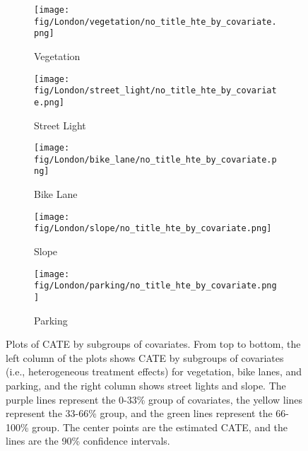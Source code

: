 \documentclass[preprint,12pt, authoryear]{elsarticle}
\begin{document}
\begin{figure}
    \centering

    \begin{subfigure}{.42\textwidth}
        \centering
        \texttt{[image: fig/London/vegetation/no\_title\_hte\_by\_covariate.png]}
        \caption*{Vegetation}
    \end{subfigure}%
    \hfill
    \begin{subfigure}{.42\textwidth}
        \centering
        \texttt{[image: fig/London/street\_light/no\_title\_hte\_by\_covariate.png]}
        \caption*{Street Light}
    \end{subfigure}

    \begin{subfigure}{.42\textwidth}
        \centering
        \texttt{[image: fig/London/bike\_lane/no\_title\_hte\_by\_covariate.png]}
        \caption*{Bike Lane}
    \end{subfigure}%
    \hfill
    \begin{subfigure}{.42\textwidth}
        \centering
        \texttt{[image: fig/London/slope/no\_title\_hte\_by\_covariate.png]}
        \caption*{Slope}
    \end{subfigure}

    \begin{subfigure}{.42\textwidth}
        \centering
        \texttt{[image: fig/London/parking/no\_title\_hte\_by\_covariate.png]}
        \caption*{Parking}
    \end{subfigure}
    \hfill
    \begin{subfigure}{.4\textwidth}
    \end{subfigure}

    \caption{Plots of CATE by subgroups of covariates. From top to bottom, the left column of the plots shows CATE by subgroups of covariates (i.e., heterogeneous treatment effects) for vegetation, bike lanes, and parking, and the right column shows street lights and slope. The purple lines represent the 0-33\% group of covariates, the yellow lines represent the 33-66\% group, and the green lines represent the 66-100\% group. The center points are the estimated CATE, and the lines are the 90\% confidence intervals.}
    \label{result:fig:rank_cate_covariates}
\end{figure}
    
\end{document}
